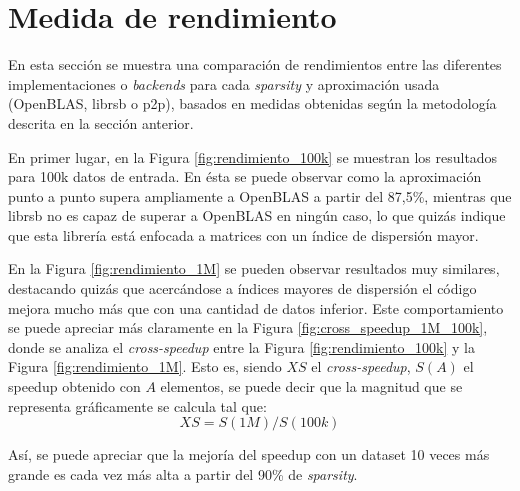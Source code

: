 \section{Medida de rendimiento}
\label{sec:medida_rendimiento}
En esta sección se muestra una comparación de rendimientos entre las diferentes implementaciones o \textit{\gls{backend}s} para cada \textit{sparsity} y aproximación usada (OpenBLAS, librsb o p2p), basados en medidas obtenidas según la metodología descrita en la sección anterior.

En primer lugar, en la Figura \ref{fig:rendimiento_100k} se muestran los resultados para 100k datos de entrada. En ésta se puede observar como la aproximación punto a punto supera ampliamente a OpenBLAS a partir del 87,5\%, mientras que librsb no es capaz de superar a OpenBLAS en ningún caso, lo que quizás indique que esta librería está enfocada a matrices con un índice de dispersión mayor.

En la Figura \ref{fig:rendimiento_1M} se pueden observar resultados muy similares, destacando quizás que acercándose a índices mayores de dispersión el código mejora mucho más que con una cantidad de datos inferior. Este comportamiento se puede apreciar más claramente en la Figura \ref{fig:cross_speedup_1M_100k}, donde se analiza el \textit{cross-speedup} entre la Figura \ref{fig:rendimiento_100k} y la Figura \ref{fig:rendimiento_1M}. Esto es, siendo $XS$ el \textit{cross-speedup}, $S(A)$ el speedup obtenido con $A$ elementos, se puede decir que la magnitud que se representa gráficamente se calcula tal que:
\begin{equation}
    XS = S(1M) / S(100k)\nonumber
    \label{eq:cross_speedup}
\end{equation}

Así, se puede apreciar que la mejoría del speedup con un dataset 10 veces más grande es cada vez más alta a partir del 90\% de \textit{sparsity}.

